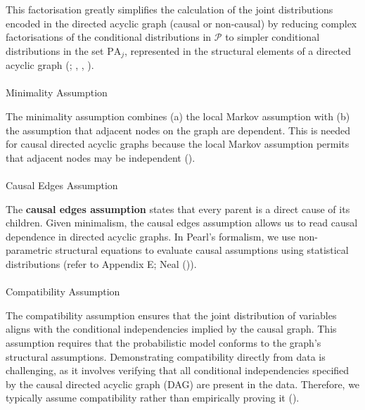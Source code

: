 \documentclass[
  single column]{article}
\makeatletter
\let\oldparagraph\paragraph
\renewcommand{\paragraph}{
    \@ifstar
      \xxxParagraphStar
      \xxxParagraphNoStar
  }
\newcommand{\xxxParagraphStar}[1]{\oldparagraph*{#1}\mbox{}}
\newcommand{\xxxParagraphNoStar}[1]{\oldparagraph{#1}\mbox{}}
\makeatother
\begin{document}
This factorisation greatly simplifies the calculation of the joint
distributions encoded in the directed acyclic graph (causal or
non-causal) by reducing complex factorisations of the conditional
distributions in \(\mathcal{P}\) to simpler conditional distributions in
the set \(\text{PA}_j\), represented in the structural elements of a
directed acyclic graph (; ,
, ).

\paragraph{Minimality Assumption}\label{minimality-assumption}

The minimality assumption combines (a) the local Markov assumption with
(b) the assumption that adjacent nodes on the graph are dependent. This
is needed for causal directed acyclic graphs because the local Markov
assumption permits that adjacent nodes may be independent
().

\paragraph{Causal Edges Assumption}\label{causal-edges-assumption}

The \textbf{causal edges assumption} states that every parent is a
direct cause of its children. Given minimalism, the causal edges
assumption allows us to read causal dependence in directed acyclic
graphs. In Pearl's formalism, we use non-parametric structural equations
to evaluate causal assumptions using statistical distributions (refer to
Appendix E; Neal ()).

\paragraph{Compatibility Assumption}\label{compatibility-assumption}

The compatibility assumption ensures that the joint distribution of
variables aligns with the conditional independencies implied by the
causal graph. This assumption requires that the probabilistic model
conforms to the graph's structural assumptions. Demonstrating
compatibility directly from data is challenging, as it involves
verifying that all conditional independencies specified by the causal
directed acyclic graph (DAG) are present in the data. Therefore, we
typically assume compatibility rather than empirically proving it
().
\end{document}
